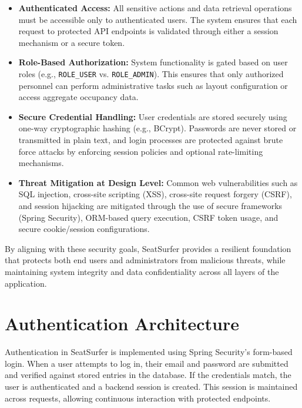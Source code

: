 \documentclass[12pt,a4paper]{report}
\begin{document}
\begin{itemize}
    \item \textbf{Authenticated Access:} All sensitive actions and data retrieval operations must be accessible only to authenticated users. The system ensures that each request to protected API endpoints is validated through either a session mechanism or a secure token.
    
    \item \textbf{Role-Based Authorization:} System functionality is gated based on user roles (e.g., \verb|ROLE_USER| vs. \verb|ROLE_ADMIN|). This ensures that only authorized personnel can perform administrative tasks such as layout configuration or access aggregate occupancy data.
    
    \item \textbf{Secure Credential Handling:} User credentials are stored securely using one-way cryptographic hashing (e.g., BCrypt). Passwords are never stored or transmitted in plain text, and login processes are protected against brute force attacks by enforcing session policies and optional rate-limiting mechanisms.
    
    \item \textbf{Threat Mitigation at Design Level:} Common web vulnerabilities such as SQL injection, cross-site scripting (XSS), cross-site request forgery (CSRF), and session hijacking are mitigated through the use of secure frameworks (Spring Security), ORM-based query execution, CSRF token usage, and secure cookie/session configurations.
\end{itemize}

By aligning with these security goals, SeatSurfer provides a resilient foundation that protects both end users and administrators from malicious threats, while maintaining system integrity and data confidentiality across all layers of the application.

\section{Authentication Architecture}

Authentication in SeatSurfer is implemented using Spring Security's form-based login. When a user attempts to log in, their email and password are submitted and verified against stored entries in the database. If the credentials match, the user is authenticated and a backend session is created. This session is maintained across requests, allowing continuous interaction with protected endpoints.
\end{document}
